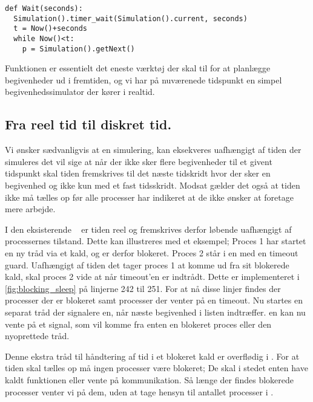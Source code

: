 \begin{lstlisting}[firstnumber=20,float=hbtp, label=wait, caption=Wait i simuleringsversionen.] 
def Wait(seconds): 
  Simulation().timer_wait(Simulation().current, seconds) 
  t = Now()+seconds
  while Now()<t: 
    p = Simulation().getNext() 
\end{lstlisting}

Funktionen  er essentielt det eneste værktøj der skal til for at planlægge begivenheder ud i fremtiden, og vi har på nuværenede tidspunkt en simpel begivenhedssimulator der kører i realtid. 

\subsection{Fra reel tid til diskret tid.}\label{sec:}
Vi ønsker sædvanligvis at en simulering, kan eksekveres uafhængigt af tiden der simuleres det vil sige at når der ikke sker flere begivenheder til et givent tidspunkt skal tiden fremskrives til det næste tidskridt hvor der sker en begivenhed og ikke kun med et fast tidsskridt. Modsat gælder det også at tiden ikke må tælles op før alle processer har indikeret at de ikke ønsker at foretage mere arbejde. 

I den eksisterende \sched ~ er tiden reel og fremskrives derfor løbende uafhængigt af processernes tilstand. Dette kan illustreres med et eksempel; Proces 1 har startet en ny tråd via et  kald, og er derfor blokeret. Proces 2 står i en  med en timeout guard. Uafhængigt af tiden det tager proces 1 at komme ud fra sit blokerede kald, skal proces 2 vide at når timeout'en er indtrådt. Dette er implementeret i \cref{fig:blocking_sleep} på linjerne 242 til 251. For at nå disse linjer findes der processer der er blokeret samt processer der venter på en timeout. Nu startes en separat tråd der signalere \sched en, når næste begivenhed i  listen indtræffer. \Sched en kan nu vente på et signal, som vil komme fra enten en blokeret proces eller den nyoprettede tråd.

Denne ekstra tråd til håndtering af tid i et blokeret kald er overflødig i \des. For at tiden skal tælles op må ingen processer være blokeret; De skal i stedet enten have kaldt funktionen  eller vente på kommunikation.  
Så længe der findes blokerede processer venter vi på dem, uden at tage hensyn til antallet processer i .

